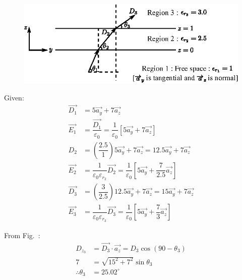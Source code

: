 \begin{solution}
~

\begin{figure}[H]
\centering
\includegraphics[scale=1.1]{images/fig6.eps}\label{chap27-fig6}
\end{figure}

Given:
\begin{align*}
\overrightarrow{D_{1}} & = 5\overrightarrow{a_{y}} + 7\overrightarrow{a_{z}}\\
\overrightarrow{E_{1}} & = \dfrac{\overrightarrow{D_{1}}}{\varepsilon_{0}} = \dfrac{1}{\varepsilon_{0}} [5\overrightarrow{a_{y}} + 7\overrightarrow{a_{z}}]\\
D_{2} & = \left(\dfrac{2.5}{1}\right) 5\overrightarrow{a_{y}} + 7\overrightarrow{a_{z}} = 12.5\overrightarrow{a_{y}} + 7\overrightarrow{a_{z}}\\
\overrightarrow{E_{2}} & = \dfrac{1}{\varepsilon_{0}\varepsilon_{r_{2}}} \overrightarrow{D_{2}} = \dfrac{1}{\varepsilon_{0}} \left[5\overrightarrow{a_{y}} + \dfrac{7}{2.5} \overrightarrow{a_{z}}\right]\\
\overrightarrow{D_{3}} & = \left(\dfrac{3}{2.5}\right) 12.5\overrightarrow{a_{y}} + 7\overrightarrow{a_{z}} = 15\overrightarrow{a_{y}} + 7\overrightarrow{a_{z}}\\
\overrightarrow{E_{3}} & = \dfrac{1}{\varepsilon_{0}\varepsilon_{r_{3}}} \overrightarrow{D_{3}} = \dfrac{1}{\varepsilon_{0}} \left[5\overrightarrow{a_{y}} + \dfrac{7}{3} \overrightarrow{a_{z}}\right]
\end{align*}

From Fig.~: 
\begin{align*}
D_{z_{3}} & = \overrightarrow{D_{3}} \cdot \overrightarrow{a_{z}} = D_{3} \cos (90 - \theta_{3})\\
7 & = \sqrt{15^{2} + 7^{2}} \sin \theta_{3}\\
\therefore \theta_{3} & = 25.02^{\circ}
\end{align*}
\end{solution}

\label{27end}


